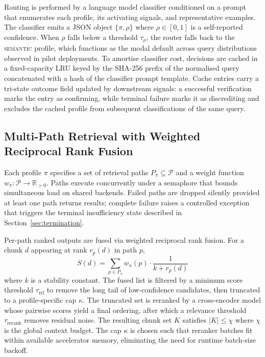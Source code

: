 Routing is performed by a language model classifier conditioned on a
prompt that enumerates each profile, its activating signals, and
representative examples. The classifier emits a JSON object
$\{\pi, \rho\}$ where $\rho \in [0,1]$ is a self-reported confidence.
When $\rho$ falls below a threshold $\tau_\rho$, the router falls back
to the \textsc{semantic} profile, which functions as the modal default
across query distributions observed in pilot deployments. To amortise
classifier cost, decisions are cached in a fixed-capacity LRU keyed by
the SHA-256 prefix of the normalised query concatenated with a hash of
the classifier prompt template. Cache entries carry a tri-state outcome
field updated by downstream signals: a successful verification marks
the entry as confirming, while terminal failure marks it as discrediting
and excludes the cached profile from subsequent classifications of the
same query.

\subsection{Multi-Path Retrieval with Weighted Reciprocal Rank Fusion}
\label{sec:retrieval}

Each profile $\pi$ specifies a set of retrieval paths
$P_\pi \subseteq \mathcal{P}$ and a weight function
$w_\pi: \mathcal{P} \to \mathbb{R}_{>0}$. Paths execute concurrently
under a semaphore that bounds simultaneous load on shared backends.
Failed paths are dropped silently provided at least one path returns
results; complete failure raises a controlled exception that triggers
the terminal insufficiency state described in Section~\ref{sec:termination}.

Per-path ranked outputs are fused via weighted reciprocal rank fusion.
For a chunk $d$ appearing at rank $r_p(d)$ in path $p$,
\begin{equation}
S(d) = \sum_{p \in P_\pi} w_\pi(p) \cdot \frac{1}{k + r_p(d)}
\end{equation}
where $k$ is a stability constant. The fused list is filtered by a
minimum score threshold $\tau_{\text{rrf}}$ to remove the long tail of
low-confidence candidates, then truncated to a profile-specific cap
$\kappa$. The truncated set is reranked by a cross-encoder model whose
pairwise scores yield a final ordering, after which a relevance
threshold $\tau_{\text{rerank}}$ removes residual noise. The resulting
chunk set $K$ satisfies $|K| \le \chi$ where $\chi$ is the global
context budget. The cap $\kappa$ is chosen such that reranker batches
fit within available accelerator memory, eliminating the need for
runtime batch-size backoff.

